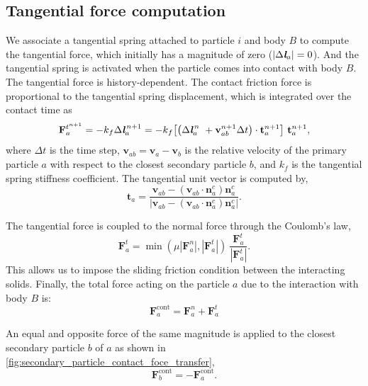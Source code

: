 \documentclass[preprint,12pt]{elsarticle}
\newcommand{\ten}[1]{\ensuremath{\mathbf{#1}}}
\begin{document}
\subsection{Tangential force computation}
\label{sec:tangential-force-computation}
We associate a tangential spring attached to particle $i$ and body $B$ to
compute the tangential force, which initially has a magnitude of zero
($|\Delta \textit{\textbf{l}}_a|=0$). And the tangential spring is activated
when the particle comes into contact with body $B$. The tangential force is
history-dependent. The contact friction force is proportional to the
tangential spring displacement, which is integrated over the contact time as
\begin{equation}
  \label{eq:tangential-force}
  \ten{F}_{a}^{t^{n+1}} =
  -k_f \Delta \textit{\textbf{l}}_a^{\,n + 1} =
  -k_f \big[\big(\Delta {\textit{\textbf{l}}}_a^{\,n} \
  + \ten{v}_{ab}^{n + 1} \Delta t\big) \cdot \ten{t}_a^{n + 1} \big] \
  \ten{t}_a^{n + 1},
\end{equation}
where $\Delta t$ is the time step, $\ten{v}_{ab} = \ten{v}_{a} - \ten{v}_b$ is
the relative velocity of the primary particle $a$ with respect to the
closest secondary particle $b$, and $k_f$ is the tangential spring stiffness
coefficient. The tangential unit vector is computed by,
\begin{equation}
  \label{eq:tangential-vect}
  \ten{t}_a = \frac{\ten{v}_{ab} - (\ten{v}_{ab} \cdot \ten{n}_a^{c}) \ten{n}_a^{c}}{|\ten{v}_{ab} - (\ten{v}_{ab} \cdot \ten{n}_a^{c}) \ten{n}_a^{c}|}.
\end{equation}

The tangential force is coupled to the normal force through the Coulomb's law,
\begin{equation}
  \label{eq:Coulomb-law}
  \ten{F}_{a}^{t} = \min(\mu |\ten{F}_{a}^{n}|, |\ten{F}_{a}^{t}|) \
  \frac{\ten{F}_{a}^{t}}{|\ten{F}_{a}^{t}|}.
\end{equation}
This allows us to impose the sliding friction condition between the
interacting solids. Finally, the total force acting on the particle $a$ due to
the interaction with body $B$ is:
\begin{equation}
  \label{eq:contact-force}
  \ten{F}_{a}^{\text{cont}} = \ten{F}_{a}^{n} + \ten{F}_{a}^{t}
\end{equation}

An equal and opposite force of the same magnitude is applied to the closest
secondary particle $b$ of $a$ as shown in
\cref{fig:secondary_particle_contact_foce_transfer},
\begin{equation}
  \label{eq:contact-force}
  \ten{F}_{b}^{\text{cont}} = - \ten{F}_{a}^{\text{cont}}.
\end{equation}
\end{document}
